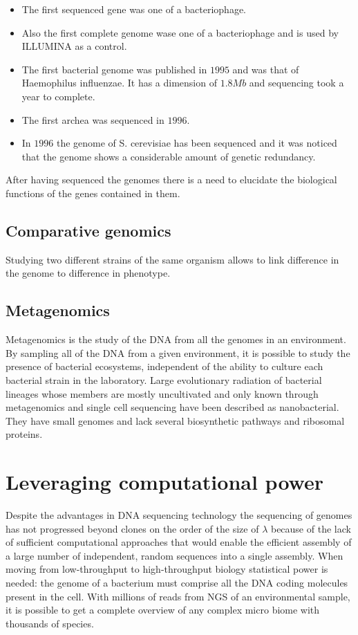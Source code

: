 	\begin{multicols}{2}
		\begin{itemize}
			\item The first sequenced gene was one of a bacteriophage.
			\item Also the first complete genome wase one of a bacteriophage and is used by ILLUMINA as a control.
			\item The first bacterial genome was published in $1995$ and was that of Haemophilus influenzae.
				It has a dimension of $1.8Mb$ and sequencing took a year to complete.
			\item The first archea was sequenced in $1996$.
			\item In $1996$ the genome of S. cerevisiae has been sequenced and it was noticed that the genome shows a considerable amount of genetic redundancy.
		\end{itemize}
	\end{multicols}
	After having sequenced the genomes there is a need to elucidate the biological functions of the genes contained in them.

	\subsection{Comparative genomics}
	Studying two different strains of the same organism allows to link difference in the genome to difference in phenotype.

	\subsection{Metagenomics}
	Metagenomics is the study of the DNA from all the genomes in an environment.
	By sampling all of the DNA from a given environment, it is possible to study the presence of bacterial ecosystems, independent of the ability to culture each bacterial strain in the laboratory.
	Large evolutionary radiation of bacterial lineages whose members are mostly uncultivated and only known through metagenomics and single cell sequencing have been described as nanobacterial.
	They have small genomes and lack several biosynthetic pathways and ribosomal proteins.

\section{Leveraging computational power}
Despite the advantages in DNA sequencing technology the sequencing of genomes has not progressed beyond clones on the order of the size of $\lambda$ because of the lack of sufficient computational approaches that would enable the efficient assembly of a large number of independent, random sequences into a single assembly.
When moving from low-throughput to high-throughput biology statistical power is needed: the genome of a bacterium must comprise all the DNA coding molecules present in the cell.
With millions of reads from NGS of an environmental sample, it is possible to get a complete overview of any complex micro biome with thousands of species.


